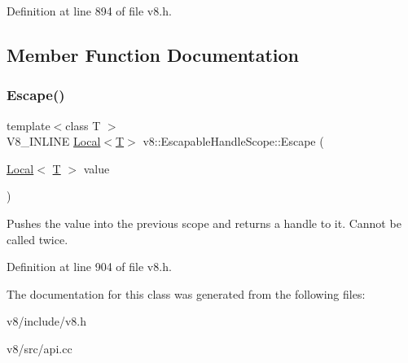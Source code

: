 Definition at line 894 of file v8.\+h.



\subsection{Member Function Documentation}
\mbox{\label{classv8_1_1EscapableHandleScope_afdf0d3850978f65d1a827f78b3a2b6fd}} 
\subsubsection{\texorpdfstring{Escape()}{Escape()}}
{\footnotesize\ttfamily template$<$class T $>$ \\
V8\+\_\+\+I\+N\+L\+I\+NE \mbox{\hyperlink{classv8_1_1Local}{Local}}$<$\mbox{\hyperlink{classv8_1_1internal_1_1torque_1_1T}{T}}$>$ v8\+::\+Escapable\+Handle\+Scope\+::\+Escape (\begin{DoxyParamCaption}\item[{\mbox{\hyperlink{classv8_1_1Local}{Local}}$<$ \mbox{\hyperlink{classv8_1_1internal_1_1torque_1_1T}{T}} $>$}]{value }\end{DoxyParamCaption})\hspace{0.3cm}{\ttfamily [inline]}}

Pushes the value into the previous scope and returns a handle to it. Cannot be called twice. 

Definition at line 904 of file v8.\+h.



The documentation for this class was generated from the following files\+:\begin{DoxyCompactItemize}
\item 
v8/include/v8.\+h\item 
v8/src/api.\+cc\end{DoxyCompactItemize}
